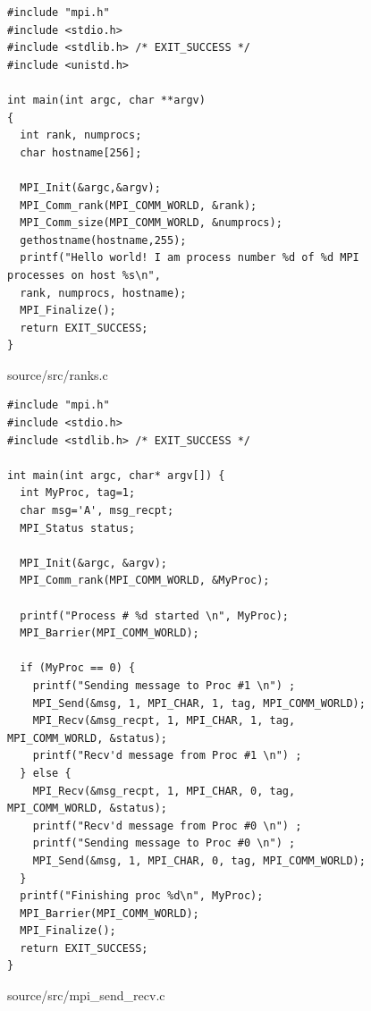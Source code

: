 \documentclass[12pt]{article}
\begin{document}
\begin{figure}[h!]
	\begin{verbatim}
#include "mpi.h"
#include <stdio.h>
#include <stdlib.h> /* EXIT_SUCCESS */
#include <unistd.h>

int main(int argc, char **argv)
{
  int rank, numprocs;
  char hostname[256];
	
  MPI_Init(&argc,&argv);
  MPI_Comm_rank(MPI_COMM_WORLD, &rank);
  MPI_Comm_size(MPI_COMM_WORLD, &numprocs);
  gethostname(hostname,255);
  printf("Hello world! I am process number %d of %d MPI processes on host %s\n",
  rank, numprocs, hostname);
  MPI_Finalize();
  return EXIT_SUCCESS;
}
	\end{verbatim}
\caption{source/src/ranks.c }\label{code:ranksc}
\end{figure}

\newpage

\begin{figure}[h!]
	\begin{verbatim}
#include "mpi.h"
#include <stdio.h>
#include <stdlib.h> /* EXIT_SUCCESS */

int main(int argc, char* argv[]) {
  int MyProc, tag=1;
  char msg='A', msg_recpt;
  MPI_Status status;
	
  MPI_Init(&argc, &argv);
  MPI_Comm_rank(MPI_COMM_WORLD, &MyProc);

  printf("Process # %d started \n", MyProc);
  MPI_Barrier(MPI_COMM_WORLD);

  if (MyProc == 0) {
    printf("Sending message to Proc #1 \n") ;
    MPI_Send(&msg, 1, MPI_CHAR, 1, tag, MPI_COMM_WORLD);
    MPI_Recv(&msg_recpt, 1, MPI_CHAR, 1, tag, MPI_COMM_WORLD, &status);
    printf("Recv'd message from Proc #1 \n") ;
  } else {
    MPI_Recv(&msg_recpt, 1, MPI_CHAR, 0, tag, MPI_COMM_WORLD, &status);
    printf("Recv'd message from Proc #0 \n") ;
    printf("Sending message to Proc #0 \n") ;
    MPI_Send(&msg, 1, MPI_CHAR, 0, tag, MPI_COMM_WORLD);
  }
  printf("Finishing proc %d\n", MyProc); 
  MPI_Barrier(MPI_COMM_WORLD); 
  MPI_Finalize();
  return EXIT_SUCCESS;
}
	\end{verbatim}
	\caption{source/src/mpi\_send\_recv.c}\label{code:sandrc}
\end{figure}

\newpage
\end{document}
